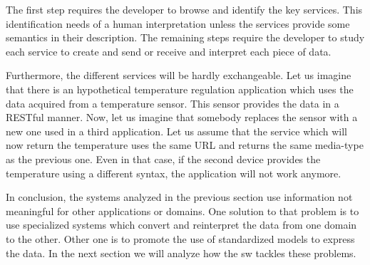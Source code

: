 
The first step requires the developer to browse and identify the key services.
This identification needs of a human interpretation unless the services provide some semantics in their description. %
The remaining steps require the developer to study each service to create and send or receive and interpret each piece of data.

Furthermore, the different services will be hardly exchangeable.
Let us imagine that there is an hypothetical temperature regulation application which uses the data acquired from a temperature sensor.
This sensor provides the data in a RESTful manner.
Now, let us imagine that somebody replaces the sensor with a new one used in a third application.
Let us assume that the service which will now return the temperature uses the same URL and returns the same media-type as the previous one.
Even in that case, if the second device provides the temperature using a different syntax, the application will not work anymore.

\medskip


In conclusion, the systems analyzed in the previous section use information not meaningful for other applications or domains.
One solution to that problem is to use specialized systems which convert and reinterpret the data from one domain to the other.
Other one is to promote the use of standardized models to express the data.
In the next section we will analyze how the \acl{sw} tackles these problems.
